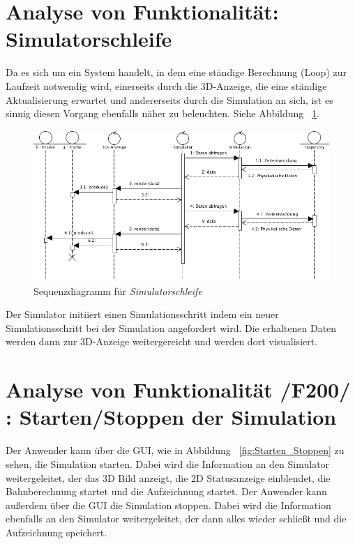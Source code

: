 
\section{Analyse von Funktionalität: Simulatorschleife}
Da es sich um ein System handelt, in dem eine ständige Berechnung (Loop) zur Laufzeit notwendig wird, einerseits durch die 3D-Anzeige, die eine ständige Aktualisierung erwartet und andererseits durch die Simulation an sich, ist es sinnig diesen Vorgang ebenfalls näher zu beleuchten. Siehe Abbildung ~\ref{fig:render_loop}.

\begin{figure}[h!]
\includegraphics[width=\linewidth]{bilder/render_loop}
\caption{Sequenzdiagramm für \textit{Simulatorschleife}}
\label{fig:render_loop}
\end{figure}

Der Simulator initiiert einen Simulationsschritt indem ein neuer Simulationsschritt bei der Simulation angefordert wird. Die erhaltenen Daten werden dann zur 3D-Anzeige weitergereicht und werden dort visualisiert.

\section{Analyse von Funktionalität /F200/ :  Starten/Stoppen der Simulation}
Der Anwender kann über die GUI, wie in Abbildung ~\ref{fig:Starten_Stoppen} zu sehen, die Simulation starten. Dabei wird die Information an den Simulator weitergeleitet, der das 3D Bild anzeigt, die 2D Statusanzeige einblendet, die Bahnberechnung startet und die Aufzeichnung startet. 
Der Anwender kann außerdem über die GUI die Simulation stoppen. Dabei wird die Information ebenfalls an den Simulator weitergeleitet, der dann alles wieder schließt und die Aufzeichnung speichert.


